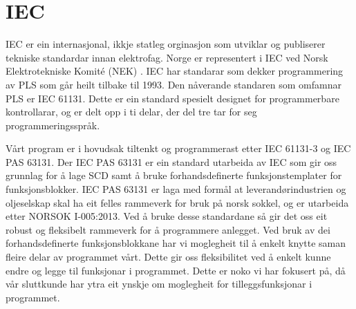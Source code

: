 \section{IEC}
\thispagestyle{fancy}
\label{sec:5.2}


\gls{IEC} \citep{IEC} er ein internasjonal, ikkje statleg orginasjon som utviklar og publiserer tekniske standardar innan elektrofag. 
Norge er representert i \gls{IEC} ved Norsk Elektrotekniske Komité (\gls{NEK}) \citep{IEC-SNL}. 
\gls{IEC} har standarar som dekker programmering av \gls{PLS} som går heilt tilbake til 1993\citep{Wiki-93}. 
Den nåverande standaren som omfamnar PLS er IEC 61131\citep{IEC-61131}. Dette er ein standard spesielt designet for programmerbare kontrollarar, og er delt opp i ti delar, der del tre tar for seg programmeringsspråk. 

Vårt program er i hovudsak tiltenkt og programmerast etter \gls{IEC} 61131-3 og \gls{IEC} \gls{PAS} 63131\citep{IEC-63131}. 
Der \gls{IEC} \gls{PAS} 63131 er ein standard utarbeida av \gls{IEC} som gir oss grunnlag for å lage \gls{SCD} samt å bruke forhandsdefinerte funksjonstemplater for funksjonsblokker. 
\gls{IEC} \gls{PAS} 63131 er laga med formål at leverandørindustrien og oljeselskap skal ha eit felles rammeverk for bruk på norsk sokkel, og er utarbeida etter NORSOK I-005:2013.
Ved å bruke desse standardane så gir det oss eit robust og fleksibelt rammeverk for å programmere anlegget. 
Ved bruk av dei forhandsdefinerte funksjonsblokkane har vi moglegheit til å enkelt knytte saman fleire delar av programmet vårt. 
Dette gir oss fleksibilitet ved å enkelt kunne endre og legge til funksjonar i programmet. 
Dette er noko vi har fokusert på, då vår sluttkunde har ytra eit ynskje om moglegheit for tilleggsfunksjonar i programmet. 
\newpage

